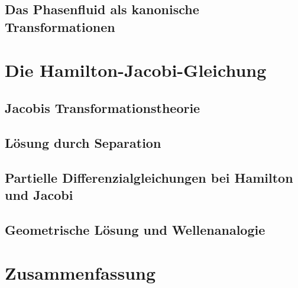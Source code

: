 \documentclass{beamer}
\begin{document}
    \subsection{Das Phasenfluid als kanonische Transformationen}
    
        
\section{Die Hamilton-Jacobi-Gleichung}

    \subsection{Jacobis Transformationstheorie}
    
    \subsection{Lösung durch Separation}
    
    \subsection{Partielle Differenzialgleichungen bei Hamilton und Jacobi}

    \subsection{Geometrische Lösung und Wellenanalogie}

\section{Zusammenfassung}
\end{document}
